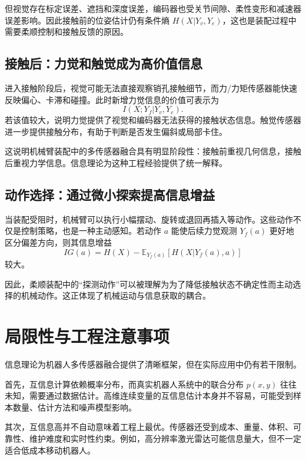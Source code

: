 \documentclass[UTF8,a4paper,12pt]{ctexart}
\begin{document}
但视觉存在标定误差、遮挡和深度误差，编码器也受关节间隙、柔性变形和减速器误差影响。因此接触前的位姿估计仍有条件熵 $H(X|Y_v,Y_e)$，这也是装配过程中需要柔顺控制和接触反馈的原因。

\subsection{接触后：力觉和触觉成为高价值信息}

进入接触阶段后，视觉可能无法直接观察销孔接触细节，而力/力矩传感器能快速反映偏心、卡滞和碰撞。此时新增力觉信息的价值可表示为
\begin{equation}
I(X;Y_f|Y_v,Y_e).
\end{equation}
若该值较大，说明力觉提供了视觉和编码器无法获得的接触状态信息。触觉传感器进一步提供接触分布，有助于判断是否发生偏斜或局部卡住。

这说明机械臂装配中的多传感器融合具有明显阶段性：接触前重视几何信息，接触后重视力学信息。信息理论为这种工程经验提供了统一解释。

\subsection{动作选择：通过微小探索提高信息增益}

当装配受阻时，机械臂可以执行小幅摆动、旋转或退回再插入等动作。这些动作不仅是控制策略，也是一种主动感知。若动作 $a$ 能使后续力觉观测 $Y_f(a)$ 更好地区分偏差方向，则其信息增益
\begin{equation}
IG(a)=H(X)-\mathbb{E}_{Y_f(a)}[H(X|Y_f(a),a)]
\end{equation}
较大。

因此，柔顺装配中的“探测动作”可以被理解为为了降低接触状态不确定性而主动选择的机械动作。这正体现了机械运动与信息获取的耦合。

\section{局限性与工程注意事项}

信息理论为机器人多传感器融合提供了清晰框架，但在实际应用中仍有若干限制。

首先，互信息计算依赖概率分布，而真实机器人系统中的联合分布 $p(x,y)$ 往往未知，需要通过数据估计。高维连续变量的互信息估计本身并不容易，可能受到样本数量、估计方法和噪声模型影响。

其次，互信息高并不自动意味着工程上最优。传感器还受到成本、重量、体积、可靠性、维护难度和实时性约束。例如，高分辨率激光雷达可能信息量大，但不一定适合低成本移动机器人。
\end{document}
